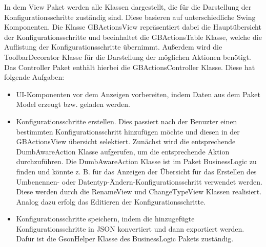 In dem View Paket werden alle Klassen dargestellt, die für die Darstellung der Konfigurationsschritte zuständig sind. Diese basieren auf unterschiedliche Swing Komponenten. Die Klasse GBActionsView repräsentiert dabei die Hauptübersicht der Konfigurationsschritte und beeinhaltet die GBActionsTable Klasse, welche die Auflistung der Konfigurationsschritte übernimmt. Außerdem wird die ToolbarDecorator Klasse für die Darstellung der möglichen Aktionen benötigt. \\
Das Controller Paket enthält hierbei die GBActionsController Klasse. Diese hat folgende Aufgaben:
\begin{itemize}
	\item UI-Komponenten vor dem Anzeigen vorbereiten, indem Daten aus dem Paket Model erzeugt bzw. geladen werden.
	\item Konfigurationsschritte erstellen. Dies passiert nach der Benuzter einen bestimmten Konfigurationsschritt hinzufügen möchte und diesen in der GBActionsView übersicht selektiert. Zunächst wird die entsprechende DumbAwareAction Klasse aufgerufen, um die entsprechende Aktion durchzuführen. Die DumbAwareAction Klasse ist im Paket BusinessLogic zu finden und könnte z. B. für das Anzeigen der Übersicht für das Erstellen des Umbenennen- oder Datentyp-Ändern-Konfigurationsschritt verwendet werden. Diese werden durch die RenameView und ChangeTypeView Klassen realisiert. Analog dazu erfolg das Editieren der Konfigurationsschritte.
	\item Konfigurationsschritte speichern, indem die hinzugefügte Konfigurationsschritte in JSON konvertiert und dann exportiert werden. Dafür ist die GsonHelper Klasse des BusinessLogic Pakets zuständig.
\end{itemize}



